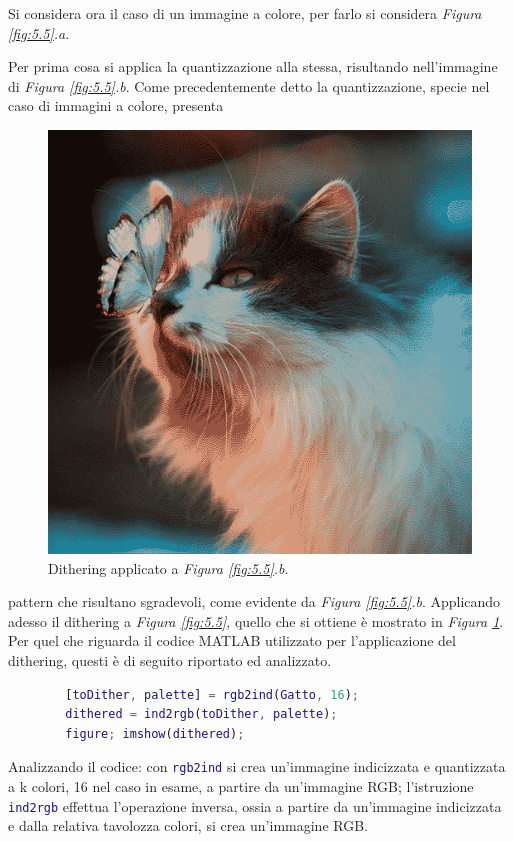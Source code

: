 \documentclass{subfiles}
\begin{document}
Si considera ora il caso di un immagine a colore, per farlo si considera \emph{Figura \ref{fig:5.5}.a}.

Per prima cosa si applica la quantizzazione alla stessa, risultando nell'immagine di \emph{Figura \ref{fig:5.5}.b}.
Come precedentemente detto la quantizzazione, specie nel caso di immagini a colore, presenta
\begin{figure}
    \centering
    \includegraphics[scale = 0.325]{../Images/Cat/DitheredCat.png}
    \caption{Dithering applicato a \emph{Figura \ref{fig:5.5}.b}.}
    \label{fig:5.6}
\end{figure}
pattern che risultano sgradevoli, come evidente da \emph{Figura \ref{fig:5.5}.b}.
Applicando adesso il dithering a \emph{Figura \ref{fig:5.5}}, quello che si ottiene è mostrato in \emph{Figura \ref{fig:5.6}}.
Per quel che riguarda il codice MATLAB utilizzato per l'applicazione del dithering, questi è di seguito riportato ed analizzato.
\begin{center}
    \begin{lstlisting}[language = MATLAB]
        % Caricamento di Gatto.png
        [toDither, palette] = rgb2ind(Gatto, 16);
        dithered = ind2rgb(toDither, palette);
        figure; imshow(dithered); 
    \end{lstlisting}
\end{center}
Analizzando il codice: con \lstinline[language = MATLAB]{rgb2ind} si crea un'immagine indicizzata e quantizzata a k colori, 16 nel caso in esame, a partire da un'immagine RGB;
l'istruzione \lstinline[language = MATLAB]{ind2rgb} effettua l'operazione inversa, ossia a partire da un'immagine indicizzata e dalla relativa tavolozza colori,
si crea un'immagine RGB.
\end{document}
